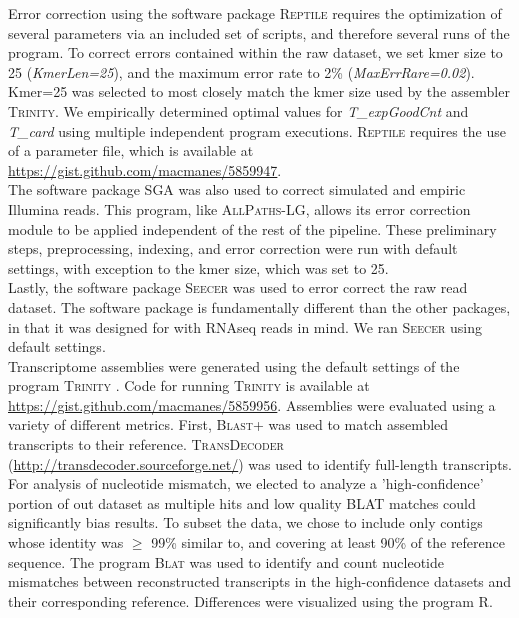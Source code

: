 \documentclass[11pt]{article}
\begin{document}
\noindent
Error correction using the software package \textsc{Reptile} requires the optimization of several parameters via an included set of scripts, and therefore several runs of the program. To correct errors contained within the raw dataset, we set kmer size to 25 (\textit{KmerLen=25}), and the maximum error rate to 2\% (\textit{MaxErrRare=0.02}). Kmer=25 was selected to most closely match the kmer size used by the assembler \textsc{Trinity}. We empirically determined optimal values for \textit{T\_expGoodCnt} and \textit{T\_card} using multiple independent program executions.  \textsc{Reptile} requires the use of a parameter file, which is available at \url{https://gist.github.com/macmanes/5859947}.   \\

\noindent
The software package \textsc{SGA} was also used to correct simulated and empiric Illumina reads. This program, like \textsc{AllPaths-LG}, allows its error correction module to be applied independent of the rest of the pipeline. These preliminary steps, preprocessing, indexing, and error correction were run with default settings, with exception to the kmer size, which was set to 25.  \\

\noindent
Lastly, the software package \textsc{Seecer} was used to error correct the raw read dataset.  The software package is fundamentally different than the other packages, in that it was designed for with RNAseq reads in mind. We ran \textsc{Seecer} using default settings.  \\
 
\noindent
Transcriptome assemblies were generated using the default settings of the program \textsc{Trinity} \citep{Grabherr:2011jb}.  Code for running \textsc{Trinity} is available at \url{https://gist.github.com/macmanes/5859956}. Assemblies were evaluated using a variety of different metrics. First, \textsc{Blast+} \citep{Camacho:2009fc} was used to match assembled transcripts to their reference.  \textsc{TransDecoder} (\url{http://transdecoder.sourceforge.net/}) was used to identify full-length transcripts. For analysis of nucleotide mismatch, we elected to analyze a 'high-confidence' portion of out dataset as multiple hits and low quality BLAT matches could significantly bias results. To subset the data, we chose to include only contigs whose identity was $\geq$ 99\% similar to, and covering at least 90\% of the reference sequence.  The program \textsc{Blat} \citep{Kent:2002jd} was used to identify and count nucleotide mismatches between reconstructed transcripts in the high-confidence datasets and their corresponding reference.  Differences were visualized using the program R. \\
\end{document}
